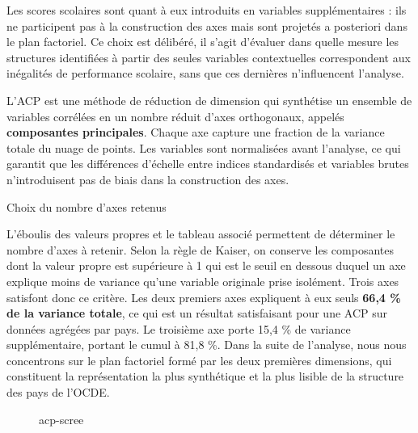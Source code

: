 \documentclass[
  french,
  11pt,
  a4paper,
]{report}
\begin{document}
Les scores scolaires sont quant à eux introduits en variables
supplémentaires : ils ne participent pas à la construction des axes mais
sont projetés a posteriori dans le plan factoriel. Ce choix est
délibéré, il s'agit d'évaluer dans quelle mesure les structures
identifiées à partir des seules variables contextuelles correspondent
aux inégalités de performance scolaire, sans que ces dernières
n'influencent l'analyse.

L'ACP est une méthode de réduction de dimension qui synthétise un
ensemble de variables corrélées en un nombre réduit d'axes orthogonaux,
appelés \textbf{composantes principales}. Chaque axe capture une
fraction de la variance totale du nuage de points. Les variables sont
normalisées avant l'analyse, ce qui garantit que les différences
d'échelle entre indices standardisés et variables brutes n'introduisent
pas de biais dans la construction des axes.

Choix du nombre d'axes retenus

L'éboulis des valeurs propres et le tableau associé permettent de
déterminer le nombre d'axes à retenir. Selon la règle de Kaiser, on
conserve les composantes dont la valeur propre est supérieure à 1 qui
est le seuil en dessous duquel un axe explique moins de variance qu'une
variable originale prise isolément. Trois axes satisfont donc ce
critère. Les deux premiers axes expliquent à eux seuls \textbf{66,4 \%
de la variance totale}, ce qui est un résultat satisfaisant pour une ACP
sur données agrégées par pays. Le troisième axe porte 15,4 \% de
variance supplémentaire, portant le cumul à 81,8 \%. Dans la suite de
l'analyse, nous nous concentrons sur le plan factoriel formé par les
deux premières dimensions, qui constituent la représentation la plus
synthétique et la plus lisible de la structure des pays de l'OCDE.

\begin{figure}


\caption{\label{fig-24}acp-scree}

\end{figure}%
\end{document}
